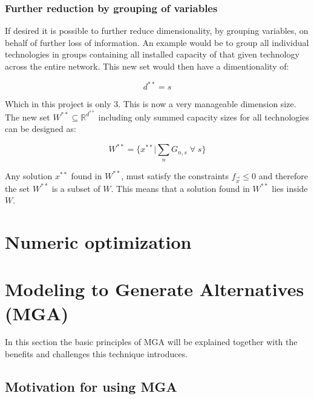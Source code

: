 \subsubsection{Further reduction by grouping of variables}
If desired it is possible to further reduce dimensionality, by grouping variables, on behalf of further loss of information. An example would be to group all individual technologies in groups containing all installed capacity of that given technology across the entire network. This new set would then have a dimentionality of:

\begin{equation} \label{eq:dim_d**}
d^{**} = s
\end{equation}

Which in this project is only $3$. This is now a very manageable dimension size. The new set $W^{**} \subseteq \mathbb{R}^{d^{**}}$ including only summed capacity sizes for all technologies can be designed as:

\begin{equation}
W^{**} = \{ x^{**}  | \sum_n G_{n,s} \; \forall \; s  \}
\end{equation}


Any solution $x^{**}$ found in $W^{**}$, must satisfy the constraints $f_{\vec{x}} \leq 0$ and therefore the set $W^{**}$ is a subset of $W$. This means that a solution found in $W^{**}$ lies inside $W$.


\section{Numeric optimization}



\section{Modeling to Generate Alternatives (MGA)}\label{sec:MGA}
In this section the basic principles of MGA will be explained together with the benefits and challenges this technique introduces. 

\subsection{Motivation for using MGA}

